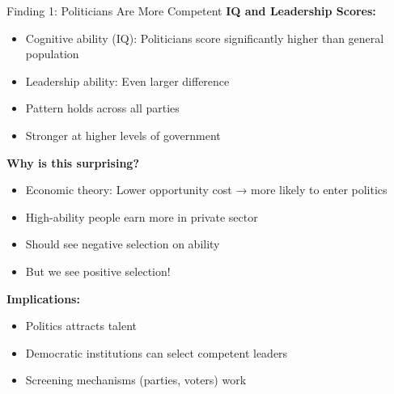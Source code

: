 \documentclass[10pt]{beamer}
\begin{document}
\begin{frame}[allowframebreaks]{Finding 1: Politicians Are More Competent}
\textbf{IQ and Leadership Scores:}


\begin{itemize}
\item \alert{Cognitive ability (IQ):} Politicians score significantly higher than general population
\item \alert{Leadership ability:} Even larger difference
\item Pattern holds across all parties
\item Stronger at higher levels of government
\end{itemize}



\textbf{Why is this surprising?}
\begin{itemize}
\item Economic theory: Lower opportunity cost → more likely to enter politics
\item High-ability people earn more in private sector
\item Should see negative selection on ability
\item \alert{But we see positive selection!}
\end{itemize}

\framebreak

\textbf{Implications:}
\begin{itemize}
\item Politics attracts talent
\item Democratic institutions can select competent leaders
\item Screening mechanisms (parties, voters) work
\end{itemize}
\end{frame}
\end{document}

